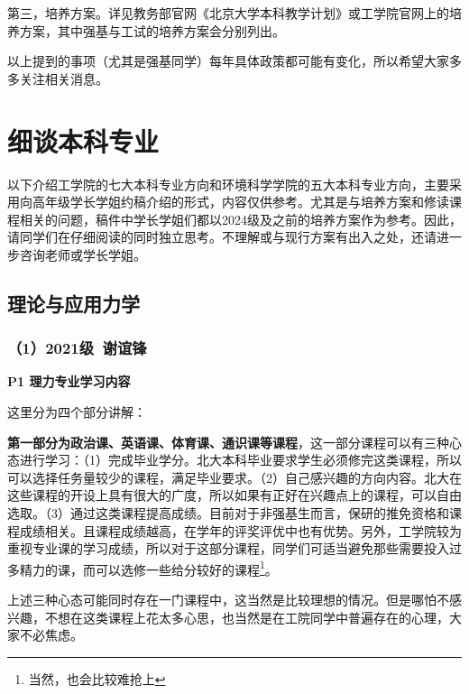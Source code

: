 \vspace{10pt}

第三，培养方案。详见教务部官网《北京大学本科教学计划》或工学院官网上的培养方案，其中强基与工试的培养方案会分别列出。

\vspace{10pt}

以上提到的事项（尤其是强基同学）每年具体政策都可能有变化，所以希望大家多多关注相关消息。

\section{细谈本科专业}
以下介绍工学院的七大本科专业方向和环境科学学院的五大本科专业方向，主要采用向高年级学长学姐约稿介绍的形式，内容仅供参考。尤其是与培养方案和修读课程相关的问题，稿件中学长学姐们都以2024级及之前的培养方案作为参考。因此，请同学们在仔细阅读的同时独立思考。不理解或与现行方案有出入之处，还请进一步咨询老师或学长学姐。
\subsection{理论与应用力学}
\subsubsection{（1）2021级\ 谢谊锋}
\textbf{P1 理力专业学习内容}

这里分为四个部分讲解：

\vspace{10pt}

\textbf{第一部分为政治课、英语课、体育课、通识课等课程}，这一部分课程可以有三种心态进行学习：（1）完成毕业学分。北大本科毕业要求学生必须修完这类课程，所以可以选择任务量较少的课程，满足毕业要求。（2）自己感兴趣的方向内容。北大在这些课程的开设上具有很大的广度，所以如果有正好在兴趣点上的课程，可以自由选取。（3）通过这类课程提高成绩。目前对于非强基生而言，保研的推免资格和课程成绩相关。且课程成绩越高，在学年的评奖评优中也有优势。另外，工学院较为重视专业课的学习成绩，所以对于这部分课程，同学们可适当避免那些需要投入过多精力的课，而可以选修一些给分较好的课程\footnote{当然，也会比较难抢上}。

\vspace{10pt}

上述三种心态可能同时存在一门课程中，这当然是比较理想的情况。但是哪怕不感兴趣，不想在这类课程上花太多心思，也当然是在工院同学中普遍存在的心理，大家不必焦虑。

\vspace{10pt}

